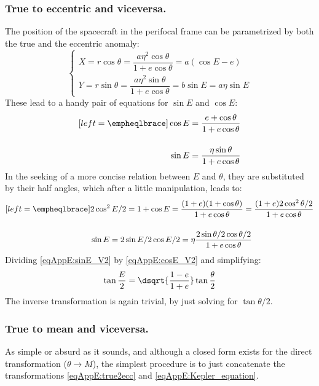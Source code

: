 		\subsubsection{True to eccentric and viceversa.}
		\indent The position of the spacecraft in the perifocal frame can be parametrized by both the true and the eccentric anomaly:
		\begin{equation}
		\left\{ \begin{array}{ll}
		X = r\cos\theta = \dfrac{a\eta^2\cos\theta}{1 + e\cos\theta} = a (\cos E - e)\\[1.2em]
		Y = r\sin\theta = \dfrac{a\eta^2\sin\theta}{1 + e\cos\theta} = b \sin E = a \eta \sin E
		\end{array}\right.
		\end{equation}
		\indent These lead to a handy pair of equations for $\sin E$ and $\cos E$:
		\begin{alignat}{4}[left = \empheqlbrace]
		\label{eqAppE:cosE}\cos E = \dfrac{e + \cos\theta}{1 + e\cos\theta}\\[1.2em]
		\label{eqAppE:sinE}\sin E = \dfrac{\eta \sin\theta}{1 + e\cos\theta}
		\end{alignat}
		\indent In the seeking of a more concise relation between $E$ and $\theta$, they are substituted by their half angles, which after a little manipulation, leads to:
		\begin{alignat}{4}[left = \empheqlbrace]
		\label{eqAppE:cosE_V2} & 2 \cos^2 E/2 = 1 + \cos E = \dfrac{(1 + e) (1 + \cos \theta)}{1 + e\cos\theta} = \dfrac{(1 + e) 2\cos^2 \theta/2 }{1 + e\cos\theta}\\[1.2em]
		\label{eqAppE:sinE_V2} & \sin E = 2 \sin E/2 \cos E/2 = \eta\dfrac{ 2 \sin \theta/2 \cos \theta/2}{1 + e\cos\theta}
		\end{alignat}
		\indent Dividing \eqref{eqAppE:sinE_V2} by \eqref{eqAppE:cosE_V2} and simplifying:
		\begin{equation}
		\tan \dfrac{E}{2}= \dsqrt{\dfrac{1 - e}{1 + e}} \tan \dfrac{\theta}{2}
		\label{eqAppE:true2ecc}
		\end{equation}
		\indent The inverse transformation is again trivial, by just solving for $\tan \theta/2$.
		\subsubsection{True to mean and viceversa.}\label{secAppE:mean2true}
		\indent As simple or absurd as it sounds, and although a closed form exists for the direct transformation (\ie $\theta \to M$), the simplest procedure is to just concatenate the transformations \eqref{eqAppE:true2ecc} and \eqref{eqAppE:Kepler_equation}.
		
